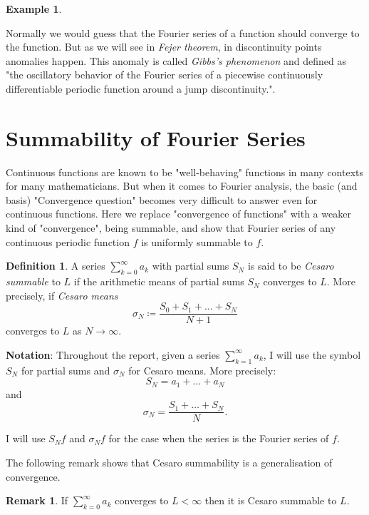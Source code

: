 \documentclass[12pt]{amsart}
\theoremstyle{definition}
\newtheorem{definition}[theorem]{Definition}
\newtheorem{example}[theorem]{Example}
\newtheorem{remark}[theorem]{Remark}
\begin{document}
\begin{example}
\begin{itemize}
    Normally we would guess that the Fourier series of a function should converge to the function. But as we will see in \emph{Fejer theorem}, in discontinuity points anomalies happen. This anomaly is called \emph{Gibbs's phenomenon} and defined as "the oscillatory behavior of the Fourier series of a piecewise continuously differentiable periodic function around a jump discontinuity."\cite{Wikipedia}.
    \end{itemize}
     \end{example}




\section{Summability of Fourier Series}


Continuous functions are known to be "well-behaving" functions in many contexts for many mathematicians. But when it comes to Fourier analysis, the basic (and basis) "Convergence question" becomes very difficult to answer even for continuous functions. Here we replace "convergence of functions" with a weaker kind of "convergence", being summable, and show that Fourier series of any continuous periodic function \(f\) is uniformly summable to \(f\).


\begin{definition}
    A series $\sum_{k=0}^{\infty} a_k$ with partial sums $S_N$ is said to be \textit{Cesaro summable} to $L$ if the arithmetic means of partial sums $S_N$ converges to $L$. More precisely, if \textit{Cesaro means}
    \[
    \sigma_N \coloneqq   \frac{S_0 + S_1 + \dots + S_N }{N+1}
    \]
    converges to $L$ as $N \longrightarrow \infty$.
\end{definition}


\textbf{Notation}:\label{notation}
    Throughout the report, given a series $\sum_{k=1}^{\infty}a_k$, I will use the symbol $S_N$ for partial sums and $\sigma_N$ for Cesaro means. More precisely:
\[
S_N = {a_1 + \dots + a_N}
\] and
\[
\sigma_N = \frac{S_1 + \dots + S_N}{N}.
\]

I will use $S_Nf$ and $\sigma_Nf$ for the case when the series is the Fourier series of $f$.





The following remark shows that Cesaro summability is a generalisation of convergence.


\begin{remark}\label{convergence to the same value to the summable limit}
    If $\sum_{k=0}^{\infty} a_k$ converges to $L < \infty$ then it is Cesaro summable to $L$.
\end{remark}
\end{document}
